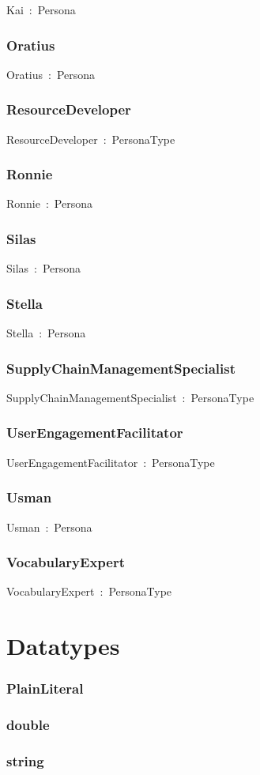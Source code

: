 \documentclass{article}
\begin{document}
Kai~:~Persona

\subsubsection*{Oratius}

Oratius~:~Persona

\subsubsection*{ResourceDeveloper}

ResourceDeveloper~:~PersonaType

\subsubsection*{Ronnie}

Ronnie~:~Persona

\subsubsection*{Silas}

Silas~:~Persona

\subsubsection*{Stella}

Stella~:~Persona

\subsubsection*{SupplyChainManagementSpecialist}

SupplyChainManagementSpecialist~:~PersonaType

\subsubsection*{UserEngagementFacilitator}

UserEngagementFacilitator~:~PersonaType

\subsubsection*{Usman}

Usman~:~Persona

\subsubsection*{VocabularyExpert}

VocabularyExpert~:~PersonaType

\section*{Datatypes}\subsubsection*{PlainLiteral}

\subsubsection*{double}

\subsubsection*{string}
\end{document}
